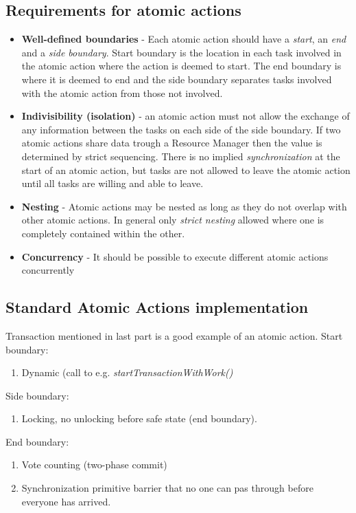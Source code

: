 \subsection{Requirements for atomic actions}
\begin{itemize}
\item \textbf{Well-defined boundaries} - Each atomic action should have a \textit{start}, an \textit{end} and a \textit{side boundary}. Start boundary is the location in each task involved in the atomic action where the action is deemed to start. The end boundary is where it is deemed to end and the side boundary separates tasks involved with the atomic action from those not involved.
\item \textbf{Indivisibility (isolation)} - an atomic action must not allow the exchange of any information between the tasks on each side of the side boundary. If two atomic actions share data trough a Resource Manager then the value is determined by strict sequencing. There is no implied \textit{synchronization} at the start of an atomic action, but tasks are not allowed to leave the atomic action until all tasks are willing and able to leave.
\item \textbf{Nesting} - Atomic actions may be nested as long as they do not overlap with other atomic actions. In general only \textit{strict nesting} allowed where one is completely contained within the other.
\item \textbf{Concurrency} - It should be possible to execute different atomic actions concurrently
\end{itemize}

\subsection{Standard Atomic Actions implementation}
Transaction mentioned in last part is a good example of an atomic action.
Start boundary:
\begin{enumerate}
\item Dynamic (call to e.g. \textit{startTransactionWithWork()}
\end{enumerate}
Side boundary:
\begin{enumerate}
\item Locking, no unlocking before safe state (end boundary).
\end{enumerate}
End boundary:
\begin{enumerate}
\item Vote counting (two-phase commit)
\item Synchronization primitive barrier that no one can pas through before everyone has arrived.
\end{enumerate}

